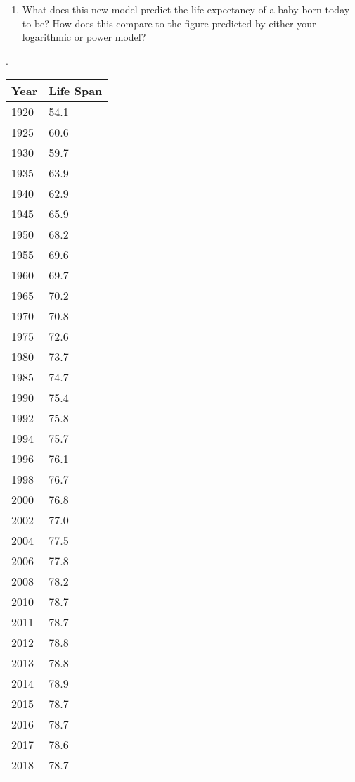 \begin{minipage}[t]{0.83\textwidth}
\begin{enumerate}
\item 
    What does this new model predict
            the life expectancy of a baby born today to be?
            How does this compare to the figure predicted
            by either your logarithmic or power model?

    \end{enumerate}

\end{minipage}
.
\hspace{1em}
\begin{minipage}[t]{0.12\textwidth}
    \par\begin{center}\begin{tabular}{m{1cm}|m{1cm}}
    Year & Life Span \\\hline
    1920 & 54.1 \\
        1925 & 60.6 \\
    1930 & 59.7 \\
        1935 & 63.9 \\
    1940 & 62.9 \\
        1945 & 65.9 \\
    1950 & 68.2 \\
    1955 & 69.6 \\
    1960 & 69.7 \\
    1965 & 70.2 \\
    1970 & 70.8 \\
    1975 & 72.6 \\
    1980 & 73.7 \\
    1985 & 74.7 \\
    1990 & 75.4 \\
    1992 & 75.8 \\
    1994 & 75.7 \\
    1996 & 76.1 \\
    1998 & 76.7 \\
    2000 & 76.8 \\
    2002 & 77.0 \\
    2004 & 77.5 \\
    2006 & 77.8 \\
    2008 & 78.2 \\
    2010 & 78.7 \\
    2011 & 78.7 \\
    2012 & 78.8 \\
    2013 & 78.8 \\
    2014 & 78.9 \\
    2015 & 78.7 \\
    2016 & 78.7 \\
    2017 & 78.6 \\
    2018 & 78.7
\end{tabular}\end{center}
\end{minipage}



